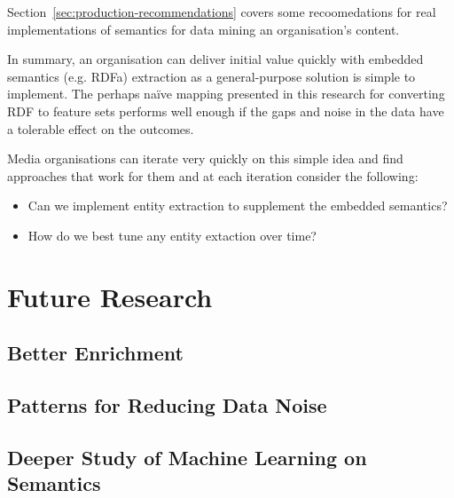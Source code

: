 Section~\ref{sec:production-recommendations} covers some recoomedations
for real implementations of semantics for data mining an organisation's
content.

In summary, an organisation can deliver initial value quickly with embedded
semantics (e.g. RDFa) extraction as a general-purpose solution is simple
to implement. The perhaps na\"ive mapping presented in this research for
converting RDF to feature sets performs well enough if the gaps and noise
in the data have a tolerable effect on the outcomes.

Media organisations can iterate very quickly on this simple idea and find
approaches that work for them and at each iteration consider the following:

\begin{itemize}
\item Can we implement entity extraction to supplement the embedded semantics?
\item How do we best tune any entity extaction over time?
\end{itemize}

\section{Future Research}
\subsection{Better Enrichment}
\subsection{Patterns for Reducing Data Noise}
\subsection{Deeper Study of Machine Learning on Semantics}

